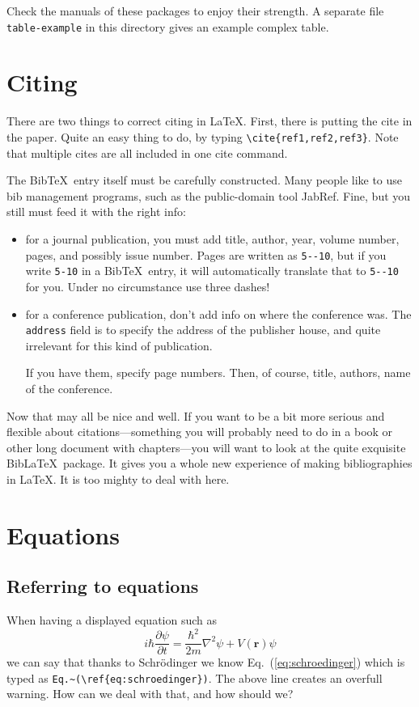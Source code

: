 \documentclass{article}
\begin{document}
Check the manuals of these packages to enjoy their strength.  A separate file  \texttt{table-example} in this directory gives an example complex table.





\section{Citing}
There are two things to correct citing in \LaTeX.  First, there is putting the cite in the paper. Quite an easy thing to do, by typing \verb+\cite{ref1,ref2,ref3}+. Note that multiple cites are all included in one cite command.

The Bib\TeX\ entry itself must be carefully constructed.  Many people like to use bib management programs, such as the public-domain tool JabRef.  Fine, but you still must feed it with the right info:
\begin{itemize}
\item for a journal publication, you must add title, author, year, volume number,
pages, and possibly issue number.  Pages are written as \verb+5--10+, but if you write \verb+5-10+ in a Bib\TeX\ entry, it will automatically translate that to \verb+5--10+ for you.  Under no circumstance use three dashes!

\item for a conference publication, don't add info on where the conference was. The \verb+address+ field is to specify the address of the publisher house, and quite irrelevant for this kind of publication.

If you have them, specify page numbers.  Then, of course, title, authors, name of the  conference.
\end{itemize}
Now that may all be nice and well.  If you want to be a bit more serious and flexible about citations---something you will probably need to do in a book or other long document with chapters---you will want to look at the quite exquisite Bib\LaTeX\ package.  It gives you a whole new experience of making bibliographies in \LaTeX.
It is too mighty to deal with here.


\section{Equations}
\subsection{Referring to equations}\label{sec:refereq}
When having a displayed equation such as
\begin{equation}\label{eq:schroedinger}
i\hbar\frac{\partial\psi}{\partial t} = \frac{\hbar^2}{2m}\nabla^2\psi + V(\mathbf{r})\psi
\end{equation}
we can say that thanks to Schr\"odinger we know Eq.~(\ref{eq:schroedinger}) which is typed as \verb+Eq.~(\ref{eq:schroedinger})+.
The above line creates an overfull warning.  How can we deal with that, and how should we?
\end{document}
